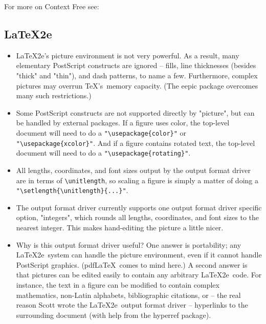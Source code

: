 \documentclass[english,a4paper]{article}
\begin{document}
	For more on Context Free see:

  \subsection{\LaTeX2e}

    \begin{itemize}
   \item \LaTeX2e's picture environment is not very powerful. As a result, many
     elementary PostScript constructs are ignored -- fills, line
     thicknesses (besides "thick" and "thin"), and dash patterns, to name a
     few. Furthermore, complex pictures may overrun \TeX's\  memory capacity.
     (The eepic package overcomes many such restrictions.)

   \item Some PostScript constructs are not supported directly by "picture",
     but can be handled by external packages. If a figure uses color, the
     top-level document will need to do a \verb+"\usepackage{color}"+ or \verb+"\usepackage{xcolor}"+. And if a
     figure contains rotated text, the top-level document will need to do a
     \verb+"\usepackage{rotating}"+.

   \item All lengths, coordinates, and font sizes output by the output format driver are in
     terms of \verb+\unitlength+, so scaling a figure is simply a matter of doing
     a \verb+"\setlength{\unitlength}{...}"+.

   \item The output format driver currently supports one output format driver specific option,
     "integers", which rounds all lengths, coordinates, and font sizes to
     the nearest integer. This makes hand-editing the picture a little
     nicer.

   \item Why is this output format driver useful? 
     One answer is portability; any \LaTeX2e\ system can handle the picture environment, 
     even if it cannot handle
     PostScript graphics. (pdf\LaTeX\ comes to mind here.) A second answer
     is that pictures can be edited easily to contain any arbitrary 
     \LaTeX2e\  code. For instance, the text in a figure can be modified to contain
     complex mathematics, non-Latin alphabets, bibliographic citations, or
     -- the real reason Scott wrote the \LaTeX2e\ output format driver -- hyperlinks to the
     surrounding document (with help from the hyperref package).
   \end{itemize}
\end{document}
